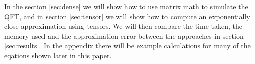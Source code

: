 \vspace{\baselineskip}
\noindent
In the section \ref{sec:dense} we will show how to use matrix math to simulate the QFT, and in section \ref{sec:tensor} we will show how to compute an exponentially close approximation using tensors. We will then compare the time taken, the memory used and the approximation error between the approaches in section \ref{sec:results}. In the appendix there will be example calculations for many of the eqations shown later in this paper. 
